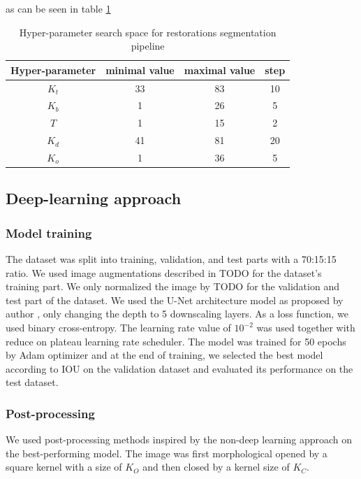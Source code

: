 as can be seen in table \ref{tab:hyper_param_segmentation}
\begin{table}
    \begin{tabular}{|c|c|c|c|}
        \hline
        Hyper-parameter & minimal value & maximal value & step \\ \hline
        $K_t$           & 33            & 83            & 10   \\ \hline
        $K_b$           & 1             & 26            & 5    \\ \hline
        $T$             & 1             & 15            & 2    \\ \hline
        $K_d$           & 41            & 81            & 20   \\ \hline
        $K_o$           & 1             & 36            & 5    \\ \hline
    \end{tabular}
    \caption{Hyper-parameter search space for restorations segmentation pipeline}
    \label{tab:hyper_param_segmentation}
\end{table}

\subsection{Deep-learning approach}
\subsubsection{Model training}
The dataset was split into training, validation, and test parts with a 70:15:15 ratio. We used image augmentations described in TODO for the dataset's training part. We only normalized the image by TODO for the validation and test part of the dataset.
We used the U-Net architecture model as proposed by author \cite{Ronneberger2015}, only changing the depth to 5 downscaling layers. As a loss function, we used binary cross-entropy. The learning rate value of $10^{-2}$ was used together with reduce on plateau learning rate scheduler. The model was trained for 50 epochs by Adam optimizer and at the end of training, we selected the best model according to IOU on the validation dataset and evaluated its performance on the test dataset.

\subsubsection{Post-processing}
We used post-processing methods inspired by the non-deep learning approach on the best-performing model. The image was first morphological opened by a square kernel with a size of $K_O$ and then closed by a kernel size of $K_C$.

